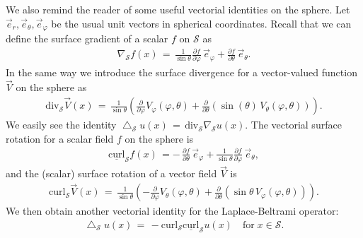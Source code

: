 \documentclass[final]{siamltex}
\newcommand{\lap}{\bigtriangleup}
\renewcommand{\S} {\mathcal{S}}
\begin{document}
We also remind the reader of some useful vectorial
identities on the sphere. Let $\vec{e}_r, \vec{e}_\theta,
\vec{e}_{\varphi} $ be the usual unit vectors in spherical coordinates.
Recall that we can define the surface gradient of a scalar $f$ on $\S$
as
\begin{align*}
\nabla_{\S} f(x) \,  = \, \frac{1}{\sin \theta}\frac{\partial f}{\partial \varphi}
\,\vec{e}_{\varphi} + \frac{\partial f}{\partial \theta}\, \vec{e}_{\theta}.
\end{align*}
In the same way we introduce the surface divergence for a vector-valued
function $\vec{V}$ on the sphere as
\begin{align*}
\mbox{div}_{\S} \vec{V}(x) \, = \, 
\frac{1}{\sin \theta} \left(
\frac{\partial}{\partial \varphi}
V_{\varphi}(\varphi,\theta) +
\frac{\partial}{\partial \theta} ( \sin(\theta) \, V_{\theta}(\varphi,\theta) )
\right).
\end{align*}
We easily see the identity $\lap_{\S}u(x) \, = \,
\mbox{div}_{\S}\nabla_{\S} u(x)$.  The vectorial surface rotation for a
scalar field $f$ on the sphere is 
\begin{align*}
\underline{\mbox{curl}}_{\S} f(x) \, = -\, \frac{\partial
f}{\partial \theta} \,\vec{e}_{\varphi} + \frac{1}{\sin
\theta}\frac{\partial f}{\partial \varphi}\, \vec{e}_{\theta},
\end{align*}
and the (scalar) surface rotation of a vector field $\vec{V}$ is
\begin{align*}
\mbox{curl}_{\S} \vec{V}(x) \, = \,
\frac{1}{\sin \theta} \left(
- \frac{\partial}{\partial \varphi} V_{\theta}(\varphi,\theta) +
\frac{\partial}{\partial \theta} (\sin \theta \, V_{\varphi}(\varphi,\theta))  
\right).
\end{align*}
We then obtain another vectorial identity for the Laplace-Beltrami operator:
\begin{align*}
\lap_{\S} u(x) \, = \, 
- \mbox{curl}_{\S} \underline{\mbox{curl}}_{\S} u(x) 
\quad \mbox{for} \; x \in {\S}.
\end{align*}
\end{document}
